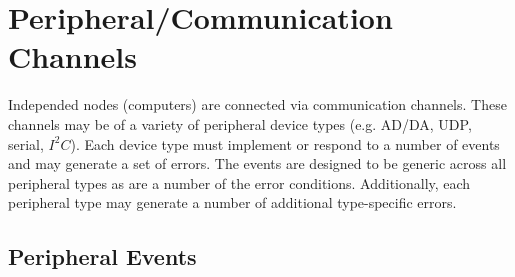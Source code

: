 \section{Peripheral/Communication Channels}

Independed nodes (computers) are connected via communication channels.  These channels may be of a variety of peripheral device types (e.g. AD/DA, UDP, serial, $I^{2}C$).  Each device type must implement or respond to a number of events and may generate a set of errors.  The events are designed to be generic across all peripheral types as are a number of the error conditions.  Additionally, each peripheral type may generate a number of additional type-specific errors.\

\subsection{Peripheral Events}


